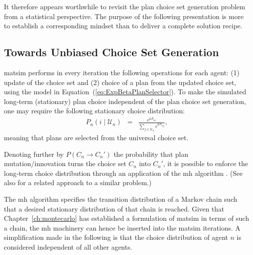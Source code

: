It therefore appears worthwhile to revisit the plan choice set generation
%
%
problem from a statistical perspective. 
The purpose of the following presentation is more to establish a corresponding 
mindset than to deliver a complete solution recipe.

\subsection{Towards Unbiased Choice Set Generation}


\gls{matsim} performs in every iteration the following operations for each
agent: (1) update of the choice set and (2) choice of a plan from
the updated choice set, using the model in Equation~(\ref{eq:ExpBetaPlanSelector}).
To make the simulated long-term (stationary) plan choice independent
of the plan choice set generation, one may require the following stationary
choice distribution:
\begin{eqnarray}
P_{n}(i\mid \mathcal{U}_n) & = & \frac{e^{\mu S_{ni}}}{\sum_{j\in \mathcal{U}_n}e^{\mu S_{nj}}},
\label{eq:global-choice-model}
\end{eqnarray}
meaning that plans are selected from the universal choice set.

Denoting further by $P(C_{n}\rightarrow C_{n}')$ the probability
that plan mutation/innovation turns the choice set $C_{n}$ into $C_{n}'$,
it is possible to enforce the long-term choice distribution 
through an application of the \gls{mh} algorithm \citep{hastings-1970}.
(See also \citet{floetteroed-2012b} for a related approach to a similar
problem.) 

The \gls{mh} algorithm specifies the transition distribution
of a Markov chain such that a desired stationary distribution of that
chain is reached. Given that Chapter~\ref{ch:montecarlo} has established
a formulation of \gls{matsim} in terms of such a chain, the \gls{mh} machinery can
hence be inserted into the \gls{matsim} iterations. A simplification made in
the following is that the choice distribution of agent $n$ is considered
independent of all other agents.

